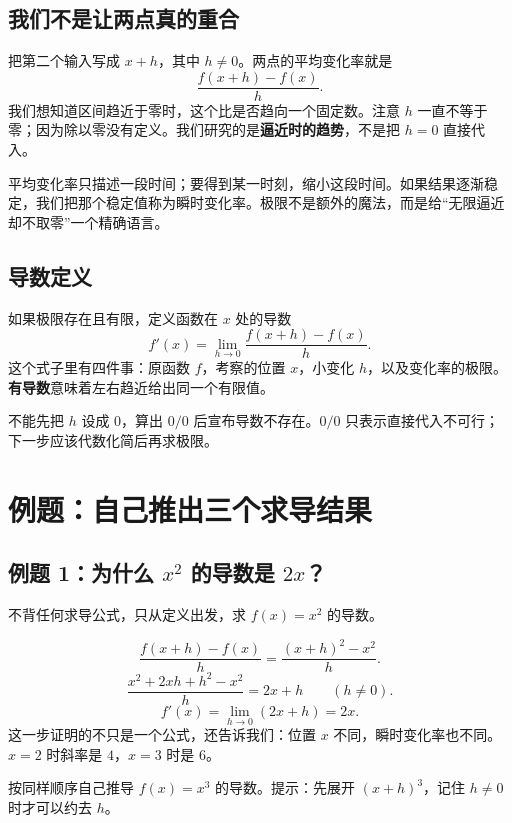 \documentclass[12pt,a4paper,UTF8,fontset=none]{ctexart}
\begin{document}
\subsection{我们不是让两点真的重合}
把第二个输入写成 $x+h$，其中 $h\ne0$。两点的平均变化率就是
\[
\frac{f(x+h)-f(x)}{h}.
\]
我们想知道区间趋近于零时，这个比是否趋向一个固定数。注意 $h$ 一直不等于零；因为除以零没有定义。我们研究的是\textbf{逼近时的趋势}，不是把 $h=0$ 直接代入。

\begin{whybox}
平均变化率只描述一段时间；要得到某一时刻，缩小这段时间。如果结果逐渐稳定，我们把那个稳定值称为瞬时变化率。极限不是额外的魔法，而是给“无限逼近却不取零”一个精确语言。
\end{whybox}

\subsection{导数定义}
如果极限存在且有限，定义函数在 $x$ 处的导数
\[
\boxed{f'(x)=\lim_{h\to0}\frac{f(x+h)-f(x)}{h}}.
\]
这个式子里有四件事：原函数 $f$，考察的位置 $x$，小变化 $h$，以及变化率的极限。\textbf{有导数}意味着左右趋近给出同一个有限值。

\begin{trapbox}
不能先把 $h$ 设成 $0$，算出 $0/0$ 后宣布导数不存在。$0/0$ 只表示直接代入不可行；下一步应该代数化简后再求极限。
\end{trapbox}

\section{例题：自己推出三个求导结果}
\subsection{例题 1：为什么 $x^2$ 的导数是 $2x$？}
\begin{questionbox}[章节例题 1]
不背任何求导公式，只从定义出发，求 $f(x)=x^2$ 的导数。
\end{questionbox}

\[
\frac{f(x+h)-f(x)}h=\frac{(x+h)^2-x^2}{h}.
\]
\[
\frac{x^2+2xh+h^2-x^2}{h}=2x+h\qquad(h\ne0).
\]
\[
f'(x)=\lim_{h\to0}(2x+h)=\boxed{2x}.
\]
这一步证明的不只是一个公式，还告诉我们：位置 $x$ 不同，瞬时变化率也不同。$x=2$ 时斜率是 $4$，$x=3$ 时是 $6$。

\begin{trybox}
按同样顺序自己推导 $f(x)=x^3$ 的导数。提示：先展开 $(x+h)^3$，记住 $h\ne0$ 时才可以约去 $h$。
\end{trybox}
\end{document}
